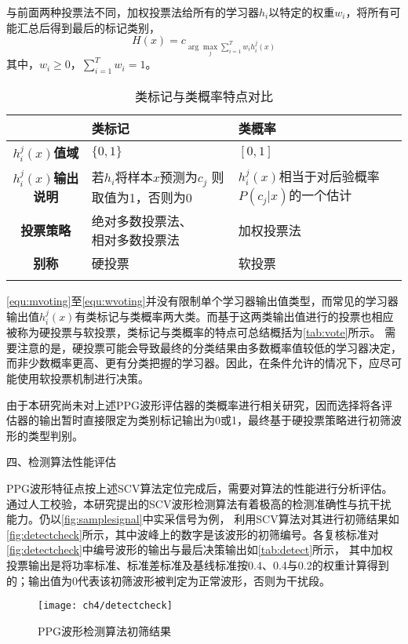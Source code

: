 与前面两种投票法不同，加权投票法给所有的学习器$h_i$以特定的权重$w_i$，将所有可能汇总后得到最后的标记类别，
\begin{equation}
    \label{equ:wvoting}
    H(x)=c_{\arg \max\limits_{j} \sum_{i=1}^T{w_ih_i^j(x)}}
\end{equation}
其中，$w_i\ge0$，$\sum_{i=1}^T{w_i=1}$。
\begin{table}[htbp]
    \centering
    \caption{\label{tab:vote}类标记与类概率特点对比}
    \begin{tabularx}{\linewidth}{c|X<{\centering}X<{\centering}}
        \Xhline{1pt} 
            &\textbf{类标记}&\textbf{类概率}\\
        \hline
        \textbf{$h_i^j(x)$值域}  &$\{0,1\}$    &$[0,1]$     \\
        \textbf{$h_i^j(x)$输出说明}&\tabincell{c}{若$h_i$将样本$x$预测为$c_j$\\则取值为1，否则为0}&\tabincell{c}{$h_i^j(x)$相当于对后验概率\\$P(c_j|x)$的一个估计}\\
        \textbf{投票策略}&\tabincell{c}{绝对多数投票法、\\相对多数投票法}&加权投票法\\
        \textbf{别称}    &硬投票 &软投票 \\
        \Xhline{1pt}
    \end{tabularx}
\end{table}

\autoref{equ:mvoting}至\autoref{equ:wvoting}并没有限制单个学习器输出值类型，而常见的学习器输出值$h_i^j(x)$有类标记与类概率两大类。而基于这两类输出值进行的投票也相应被称为硬投票与软投票，类标记与类概率的特点可总结概括为\autoref{tab:vote}所示。
需要注意的是，硬投票可能会导致最终的分类结果由多数概率值较低的学习器决定，而非少数概率更高、更有分类把握的学习器。因此，在条件允许的情况下，应尽可能使用软投票机制进行决策。

由于本研究尚未对上述PPG波形评估器的类概率进行相关研究，因而选择将各评估器的输出暂时直接限定为类别标记输出为0或1，最终基于硬投票策略进行初筛波形的类型判别。

四、检测算法性能评估

PPG波形特征点按上述SCV算法定位完成后，需要对算法的性能进行分析评估。通过人工校验，本研究提出的SCV波形检测算法有着极高的检测准确性与抗干扰能力。仍以\autoref{fig:samplesignal}中实采信号为例，
利用SCV算法对其进行初筛结果如\autoref{fig:detectcheck}所示，其中波峰上的数字是该波形的初筛编号。各复核标准对\autoref{fig:detectcheck}中编号波形的输出与最后决策输出如\autoref{tab:detect}所示，
其中加权投票输出是将功率标准、标准差标准及基线标准按0.4、0.4与0.2的权重计算得到的；输出值为0代表该初筛波形被判定为正常波形，否则为干扰段。
\begin{figure}[htbp]
    \centering
    \texttt{[image: ch4/detectcheck]}
    \caption{\label{fig:detectcheck}PPG波形检测算法初筛结果}
\end{figure}

